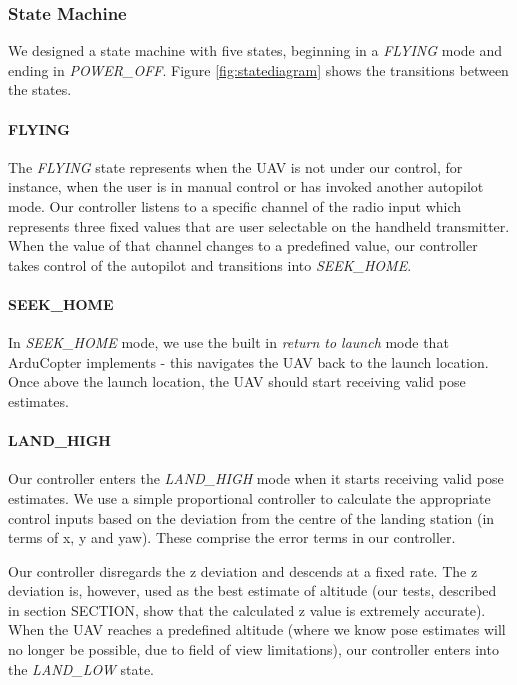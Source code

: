 \documentclass[10pt]{scrartcl} %
\begin{document}

\subsubsection{State Machine}
We designed a state machine with five states, beginning in a \textit{FLYING} mode and ending in \textit{POWER\_OFF}. Figure \ref{fig:statediagram} shows the transitions between the states. 

\paragraph{FLYING}
The \textit{FLYING} state represents when the UAV is not under our control, for instance, when the user is in manual control or has invoked another autopilot mode. Our controller listens to a specific channel of the radio input which represents three fixed values that are user selectable on the handheld transmitter. When the value of that channel changes to a predefined value, our controller takes control of the autopilot and transitions into \textit{SEEK\_HOME}.

\paragraph{SEEK\_HOME}
In \textit{SEEK\_HOME} mode, we use the built in \textit{return to launch} mode that ArduCopter implements - this navigates the UAV back to the launch location. Once above the launch location, the UAV should start receiving valid pose estimates.

\paragraph{LAND\_HIGH}
Our controller enters the \textit{LAND\_HIGH} mode when it starts receiving valid pose estimates. We use a simple proportional controller to calculate the appropriate control inputs based on the deviation from the centre of the landing station (in terms of x, y and yaw). These comprise the error terms in our controller.

Our controller disregards the z deviation and descends at a fixed rate. The z deviation is, however, used as the best estimate of altitude (our tests, described in section SECTION, show that the calculated z value is extremely accurate). When the UAV reaches a predefined altitude (where we know pose estimates will no longer be possible, due to field of view limitations), our controller enters into the \textit{LAND\_LOW} state.
\end{document}
